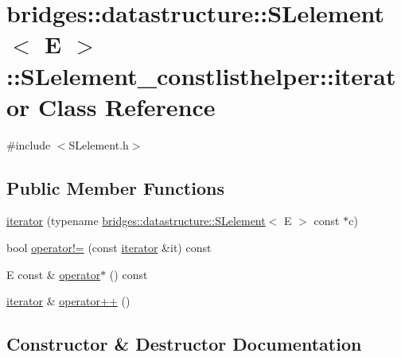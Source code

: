 \hypertarget{classbridges_1_1datastructure_1_1_s_lelement_1_1_s_lelement__constlisthelper_1_1iterator}{}\section{bridges\+:\+:datastructure\+:\+:S\+Lelement$<$ E $>$\+:\+:S\+Lelement\+\_\+constlisthelper\+:\+:iterator Class Reference}
\label{classbridges_1_1datastructure_1_1_s_lelement_1_1_s_lelement__constlisthelper_1_1iterator}


{\ttfamily \#include $<$S\+Lelement.\+h$>$}

\subsection*{Public Member Functions}
\begin{DoxyCompactItemize}
\item 
\hyperlink{classbridges_1_1datastructure_1_1_s_lelement_1_1_s_lelement__constlisthelper_1_1iterator_a438b2bda67331a3a989ea5fa45c30f7f}{iterator} (typename \hyperlink{classbridges_1_1datastructure_1_1_s_lelement}{bridges\+::datastructure\+::\+S\+Lelement}$<$ E $>$ const $\ast$c)
\item 
bool \hyperlink{classbridges_1_1datastructure_1_1_s_lelement_1_1_s_lelement__constlisthelper_1_1iterator_a65e17e54ef5f08c3deaee084951bda6a}{operator!=} (const \hyperlink{classbridges_1_1datastructure_1_1_s_lelement_1_1_s_lelement__constlisthelper_1_1iterator}{iterator} \&it) const
\item 
E const  \& \hyperlink{classbridges_1_1datastructure_1_1_s_lelement_1_1_s_lelement__constlisthelper_1_1iterator_a8d41bb42239d7df41879aa67d15842ed}{operator$\ast$} () const
\item 
\hyperlink{classbridges_1_1datastructure_1_1_s_lelement_1_1_s_lelement__constlisthelper_1_1iterator}{iterator} \& \hyperlink{classbridges_1_1datastructure_1_1_s_lelement_1_1_s_lelement__constlisthelper_1_1iterator_a3ae6ebe78df57195446770f1c7872fdd}{operator++} ()
\end{DoxyCompactItemize}


\subsection{Constructor \& Destructor Documentation}
\mbox{\label{classbridges_1_1datastructure_1_1_s_lelement_1_1_s_lelement__constlisthelper_1_1iterator_a438b2bda67331a3a989ea5fa45c30f7f}} 
